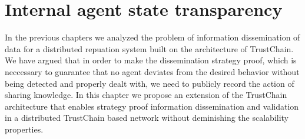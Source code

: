 \chapter{Internal agent state transparency}

In the previous chapters we analyzed the problem of information dissemination of data for a 
distributed repuation system built on the architecture of TrustChain. We have argued that in order
to make the dissemination strategy proof, which is neccessary to guarantee that no agent deviates 
from the desired behavior without being detected and properly dealt with, we need to publicly record
the action of sharing knowledge. In this chapter we propose an extension of the TrustChain architecture
that enables strategy proof information dissemination and validation in a distributed TrustChain 
based network without deminishing the scalability properties.

